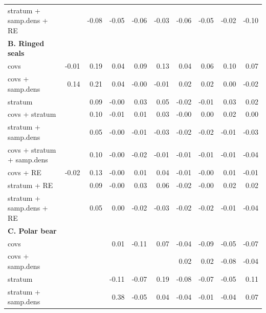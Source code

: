 \documentclass[]{rsos}%
\begin{document}
\begin{table}[ht]
\begin{tabular}{lrrrrrrrrr}
  stratum + samp.dens + RE &  & -0.08 & -0.05 & -0.06 & -0.03 & -0.06 & -0.05 & -0.02 & -0.10 \\   {\bf B. Ringed seals} & & & & & & & & & \\
  covs & -0.01 & 0.19 & 0.04 & 0.09 & 0.13 & 0.04 & 0.06 & 0.10 & 0.07 \\
  covs + samp.dens & 0.14 & 0.21 & 0.04 & -0.00 & -0.01 & 0.02 & 0.02 & 0.00 & -0.02 \\
  stratum &  & 0.09 & -0.00 & 0.03 & 0.05 & -0.02 & -0.01 & 0.03 & 0.02 \\
  covs + stratum &  & 0.10 & -0.01 & 0.01 & 0.03 & -0.00 & 0.00 & 0.02 & 0.00 \\
  stratum + samp.dens &  & 0.05 & -0.00 & -0.01 & -0.03 & -0.02 & -0.02 & -0.01 & -0.03 \\
  covs + stratum + samp.dens &  & 0.10 & -0.00 & -0.02 & -0.01 & -0.01 & -0.01 & -0.01 & -0.04 \\
  covs + RE & -0.02 & 0.13 & -0.00 & 0.01 & 0.04 & -0.01 & -0.00 & 0.01 & -0.01 \\
  stratum + RE &  & 0.09 & -0.00 & 0.03 & 0.06 & -0.02 & -0.00 & 0.02 & 0.02 \\
  stratum + samp.dens + RE &  & 0.05 & 0.00 & -0.02 & -0.03 & -0.02 & -0.02 & -0.01 & -0.04 \\
  {\bf C. Polar bear} & & & & & & & & & \\
  covs &  &  & 0.01 & -0.11 & 0.07 & -0.04 & -0.09 & -0.05 & -0.07 \\
  covs + samp.dens &  &  &  &  &  & 0.02 & 0.02 & -0.08 & -0.04 \\
  stratum &  &  & -0.11 & -0.07 & 0.19 & -0.08 & -0.07 & -0.05 & 0.11 \\
  stratum + samp.dens &  &  & 0.38 & -0.05 & 0.04 & -0.04 & -0.01 & -0.04 & 0.07 \\
   \hline
\end{tabular}
\end{table}
\end{document}

